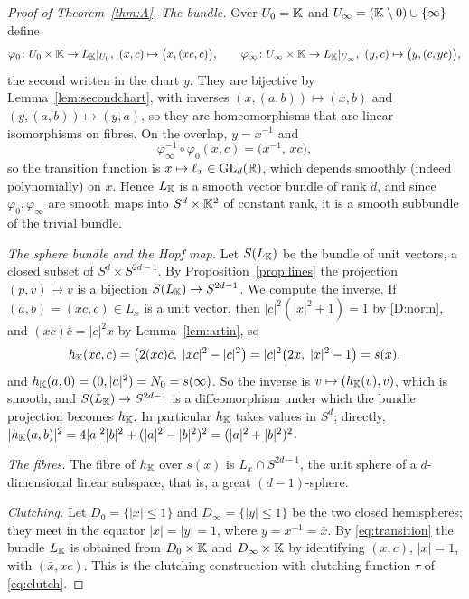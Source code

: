 \begin{proof}[Proof of Theorem~\ref{thm:A}]
\emph{The bundle.} Over $U_0=\mathbb{K}$ and $U_\infty=(\mathbb{K}\setminus0)\cup\{\infty\}$ define
\[
\varphi_0\colon U_0\times\K\to L_\K|_{U_0},\ (x,c)\mapsto\bigl(x,(xc,c)\bigr),\qquad
\varphi_\infty\colon U_\infty\times\K\to L_\K|_{U_\infty},\ (y,c)\mapsto\bigl(y,(c,yc)\bigr),
\]
the second written in the chart $y$. They are bijective by Lemma~\ref{lem:secondchart}, with inverses $(x,(a,b))\mapsto(x,b)$ and $(y,(a,b))\mapsto(y,a)$, so they are homeomorphisms that are linear isomorphisms on fibres. On the overlap, $y=x^{-1}$ and
\begin{equation}\label{eq:transition}
\varphi_\infty^{-1}\circ\varphi_0(x,c)=\bigl(x^{-1},\,xc\bigr),
\end{equation}
so the transition function is $x\mapsto\ell_x\in\mathrm{GL}_d(\mathbb{R})$, which depends smoothly (indeed polynomially) on $x$. Hence $L_{\mathbb{K}}$ is a smooth vector bundle of rank $d$, and since $\varphi_0,\varphi_\infty$ are smooth maps into $S^d\times\mathbb{K}^2$ of constant rank, it is a smooth subbundle of the trivial bundle.

\emph{The sphere bundle and the Hopf map.} Let $S(L_{\mathbb{K}})$ be the bundle of unit vectors, a closed subset of $S^d\times S^{2d-1}$. By Proposition~\ref{prop:lines} the projection $(p,v)\mapsto v$ is a bijection $S(L_{\mathbb{K}})\to S^{2d-1}$. We compute the inverse. If $(a,b)=(xc,c)\in L_x$ is a unit vector, then $|c|^2(|x|^2+1)=1$ by \ref{D:norm}, and $(xc)\bar c=|c|^2x$ by Lemma~\ref{lem:artin}, so
\[
h_{\mathbb{K}}(xc,c)=\bigl(2(xc)\bar c,\;|xc|^2-|c|^2\bigr)=|c|^2\bigl(2x,\;|x|^2-1\bigr)=s(x),
\]
and $h_{\mathbb{K}}(a,0)=(0,|a|^2)=N_0=s(\infty)$. So the inverse is $v\mapsto(h_{\mathbb{K}}(v),v)$, which is smooth, and $S(L_{\mathbb{K}})\to S^{2d-1}$ is a diffeomorphism under which the bundle projection becomes $h_{\mathbb{K}}$. In particular $h_{\mathbb{K}}$ takes values in $S^d$; directly, $|h_{\mathbb{K}}(a,b)|^2=4|a|^2|b|^2+(|a|^2-|b|^2)^2=(|a|^2+|b|^2)^2$.

\emph{The fibres.} The fibre of $h_{\mathbb{K}}$ over $s(x)$ is $L_x\cap S^{2d-1}$, the unit sphere of a $d$-dimensional linear subspace, that is, a great $(d-1)$-sphere.

\emph{Clutching.} Let $D_0=\{|x|\le1\}$ and $D_\infty=\{|y|\le1\}$ be the two closed hemispheres; they meet in the equator $|x|=|y|=1$, where $y=x^{-1}=\bar x$. By \eqref{eq:transition} the bundle $L_{\mathbb{K}}$ is obtained from $D_0\times\mathbb{K}$ and $D_\infty\times\mathbb{K}$ by identifying $(x,c)$, $|x|=1$, with $(\bar x,xc)$. This is the clutching construction with clutching function $\tau$ of \eqref{eq:clutch}.
\end{proof}

